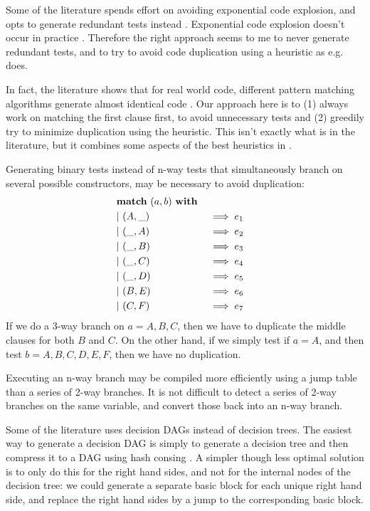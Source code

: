 \documentclass[a4paper, 11pt]{article}
\theoremstyle{definition}
\begin{document}
Some of the literature spends effort on avoiding exponential code explosion, and opts to generate redundant tests instead \cite{augustsson_compiling_1985}. Exponential code explosion doesn't occur in practice \cite{scott_when_2000}. Therefore the right approach seems to me to never generate redundant tests, and to try to avoid code duplication using a heuristic as e.g. \cite{maranget_compiling_2008} does.

In fact, the literature shows that for real world code, different pattern matching algorithms generate almost identical code \cite{scott_when_2000,maranget_compiling_2008}. Our approach here is to (1) always work on matching the first clause first, to avoid unnecessary tests and (2) greedily try to minimize duplication using the heuristic. This isn't exactly what is in the literature, but it combines some aspects of the best heuristics in \cite{maranget_compiling_2008}.

Generating binary tests instead of n-way tests that simultaneously branch on several possible constructors, may be necessary to avoid duplication:
\begin{alignat*}{4}
  &\mathbf{match}\ (a,b)\ \mathbf{with} \\
  &\mathbf{\mid}\ (A,\_)\quad &&\implies e_1 & \\
  &\mathbf{\mid}\ (\_,A)\quad &&\implies e_2 & \\
  &\mathbf{\mid}\ (\_,B)\quad &&\implies e_3 & \\
  &\mathbf{\mid}\ (\_,C)\quad &&\implies e_4 & \\
  &\mathbf{\mid}\ (\_,D)\quad &&\implies e_5 & \\
  &\mathbf{\mid}\ (B,E)\quad &&\implies e_6 & \\
  &\mathbf{\mid}\ (C,F)\quad &&\implies e_7 &
\end{alignat*}
If we do a 3-way branch on $a=A,B,C$, then we have to duplicate the middle clauses for both $B$ and $C$. On the other hand, if we simply test if $a=A$, and then test $b=A,B,C,D,E,F$, then we have no duplication.

Executing an n-way branch may be compiled more efficiently using a jump table than a series of 2-way branches. It is not difficult to detect a series of 2-way branches on the same variable, and convert those back into an n-way branch.

Some of the literature uses decision DAGs instead of decision trees. The easiest way to generate a decision DAG is simply to generate a decision tree and then compress it to a DAG using hash consing \cite{maranget_compiling_2008}. A simpler though less optimal solution is to only do this for the right hand sides, and not for the internal nodes of the decision tree: we could generate a separate basic block for each unique right hand side, and replace the right hand sides by a jump to the corresponding basic block.
\end{document}

